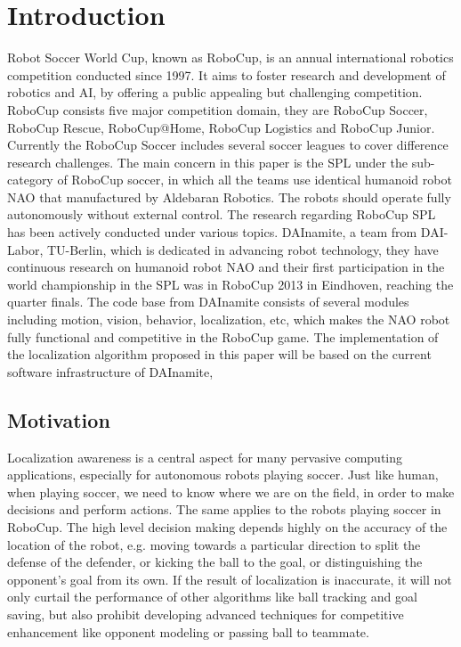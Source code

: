 \chapter{Introduction\label{cha:chapter1}}

Robot Soccer World Cup, known as RoboCup, is an annual international robotics competition conducted since 1997. It aims to foster research and development of robotics and \gls{AI}, by offering a public appealing but challenging competition. RoboCup consists five major competition domain, they are RoboCup Soccer, RoboCup Rescue, RoboCup@Home, RoboCup Logistics and RoboCup Junior. Currently the RoboCup Soccer includes several soccer leagues to cover difference research challenges. The main concern in this paper is the \gls{SPL} under the sub-category of RoboCup soccer, in which all the teams use identical humanoid robot NAO that manufactured by Aldebaran Robotics{\textregistered}. The robots should operate fully autonomously without external control. 
The research regarding RoboCup \gls{SPL} has been actively conducted under various topics. DAInamite, a team from DAI-Labor, TU-Berlin, which is dedicated in advancing robot technology, they have continuous research on humanoid robot NAO and their first participation in the world championship in the \gls{SPL} was in RoboCup 2013 in Eindhoven, reaching the quarter finals. The code base from DAInamite consists of several modules including motion, vision, behavior, localization, etc, which makes the NAO robot fully functional and competitive in the RoboCup game.
The implementation of the localization algorithm proposed in this paper will be based on the current software infrastructure of DAInamite,  

\section{Motivation\label{sec:moti}}
Localization awareness is a central aspect for many pervasive computing applications, especially for autonomous robots playing soccer. Just like human,  when playing soccer, we need to know where we are on the field, in order to make decisions and perform actions. The same applies to the robots playing soccer in RoboCup. The high level decision making depends highly on the accuracy of the location of the robot, e.g. moving towards a particular direction to split the defense of the defender, or kicking the ball to the goal, or distinguishing the opponent's goal from its own. If the result of localization is inaccurate, it will not only curtail the performance of other algorithms like ball tracking and goal saving, but also prohibit developing advanced techniques for competitive enhancement like opponent modeling or passing ball to teammate. 


